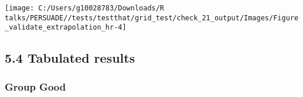 \documentclass[
]{article}
\begin{document}
\begin{flushleft}\texttt{[image: C:/Users/g10028783/Downloads/R talks/PERSUADE//tests/testthat/grid\_test/check\_21\_output/Images/Figure\_validate\_extrapolation\_hr-4]} \end{flushleft}

\clearpage

\subsection{5.4 Tabulated results}\label{tabulated-results}

\subsubsection{Group Good}\label{group-good}
\end{document}
